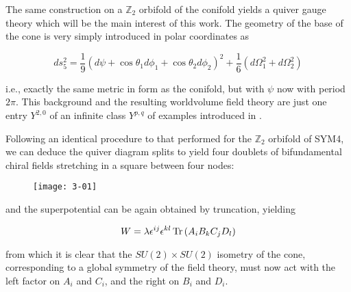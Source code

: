 The same construction on a $\mathbb{Z}_2$ orbifold of the conifold yields a quiver gauge theory which will be the main interest of this work. The geometry of the base of the cone is very simply introduced in polar coordinates as 

\begin{equation}
	ds^2_5 = \frac{1}{9} (d\psi + \cos\theta_1 d\phi_1 + \cos\theta_2 d\phi_2)^2 + \frac{1}{6} (d\Omega_1^2 + d\Omega_2^2)
\end{equation}

i.e., exactly the same metric in form as the conifold, but with $\psi$ now with period $2\pi$. This background and the resulting worldvolume field theory are just one entry $Y^{2,0}$ of an infinite class $Y^{p,q}$ of examples introduced in \cite{benvenutiInfinite}.

Following an identical procedure to that performed for the $\mathbb{Z}_2$ orbifold of SYM4, we can deduce the quiver diagram splits to yield four doublets of bifundamental chiral fields stretching in a square between four nodes:

\begin{figure}[H]
	\centering
\texttt{[image: 3-01]}
\end{figure}

and the superpotential can be again obtained by truncation, yielding

\begin{equation}
	W = \lambda \epsilon^{ij} \epsilon^{kl} \operatorname{Tr}\left( A_i B_k C_j D_l \right)
	\label{}
\end{equation}

from which it is clear that the $SU(2) \times SU(2)$ isometry of the cone, corresponding to a global symmetry of the field theory, must now act with the left factor on $A_i$ and $C_i$, and the right on $B_i$ and $D_i$. 

